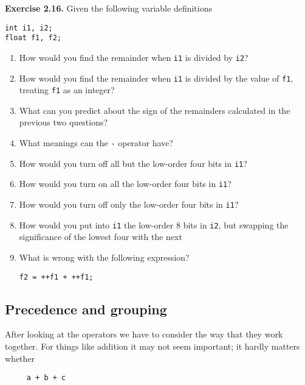    

   

    \textbf{Exercise 2.16.} Given the following variable definitions

\begin{Verbatim}
int i1, i2;
float f1, f2;
\end{Verbatim}
\begin{enumerate}
      \item How would you find the remainder when \texttt{i1} is
       divided by \texttt{i2}?
      \item How would you find the remainder when \texttt{i1} is
       divided by the value of \texttt{f1},
       treating \texttt{f1} as an integer?
      \item What can you predict about the sign of the remainders calculated in
       the previous two questions?
      \item What meanings can the \texttt{-} operator have?
      \item How would you turn off all but the low-order four bits
       in \texttt{i1}?
      \item How would you turn on all the low-order four bits
       in \texttt{i1}?
      \item How would you turn off only the low-order four bits
       in \texttt{i1}?
      \item How would you put into \texttt{i1} the low-order
       8 bits in \texttt{i2}, but swapping the significance of
       the lowest four with the next
      \item What is wrong with the following expression?
       \begin{Verbatim}
f2 = ++f1 + ++f1;
\end{Verbatim}

      
     \end{enumerate}

   

  

  \subsection{Precedence and grouping}\label{subsec:precGrp}
   

   After looking at the operators we have to consider the way that they
    work together. For things like addition it may not seem important; it
    hardly matters whether


   \begin{Verbatim}
     a + b + c
   \end{Verbatim}


